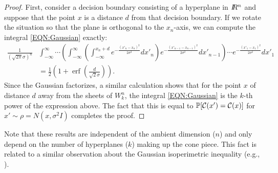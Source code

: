 \begin{proof}
First, consider a decision boundary consisting of a hyperplane in $I\!\!R^n$
and suppose that the point $x$ is a distance $d$ from that decision boundary. If we rotate the situation so that the plane is orthogonal to the $x_{n}$-axis, we can compute the integral \eqref{EQN:Gaussian} exactly:
\begin{align*}
\frac{1}{\left(\sqrt{2\pi}\sigma\right)^{n}}& \int_{-\infty}^{\infty} \cdots \left( \int_{-\infty}^{\infty}\left( \int_{-\infty}^{x_n+d} e^{-\frac{\left(  x'_n-x_n\right)  ^{2}}{2\sigma^2}
}dx'_n \right)e^{-\frac{\left(  x'_{n-1}-x_{n-1}\right)  ^{2}}{2\sigma^2}} dx'_{n-1}\right) \cdots e^{-\frac{\left(  x'_{1}-x_{1}\right)  ^{2}}{2\sigma^2}} dx'_{1}
\\
&=\frac{1}{2}\left(  1+\operatorname{erf}\left(  \frac{d}{\sqrt
{2}\sigma}\right)  \right).
\end{align*}
Since the Gaussian factorizes, a similar calculation shows that for the point $x$ of distance $d$ away from the sheets of $W_k^n$, the integral \eqref{EQN:Gaussian} is the $k$-th power of the expression above. The fact that this is equal to $\mathbb{P}[\mathcal{C}(x')=\mathcal{C}(x)]$ for $x' \sim \rho = N(x, \sigma^2 I)$ completes the proof.
\end{proof}


Note that these results are independent of the ambient dimension ($n$) and only depend on the number of hyperplanes ($k$) making up the cone piece. This fact is related to a similar observation about the Gaussian isoperimetric inequality (e.g., \cite{ledoux1996isoperimetry}).

